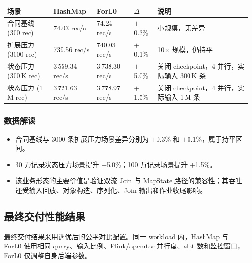 \documentclass[a4paper,11pt]{article}
\begin{document}
\begin{table}[H]
\centering
\small
\begin{tabularx}{\textwidth}{L{3.2cm} R{2.5cm} R{2.5cm} R{1.5cm} X}
\toprule
\textbf{场景} & \textbf{HashMap} & \textbf{ForL0} & $\Delta$ & \textbf{说明} \\
\midrule
合同基线 (300 rec) & 74.03 rec/s & 74.24 rec/s & $+$0.3\% & 小规模，无差异 \\
扩展压力 (3000 rec) & 739.56 rec/s & 740.03 rec/s & $+$0.1\% & 10$\times$ 规模，仍持平 \\
状态压力 (300\,K rec) & 3\,559.34 rec/s & 3\,738.30 rec/s & $+$5.0\% & 关闭 checkpoint，4 并行，实际输入 300\,K 条 \\
状态压力 (1\,M rec) & 3\,721.63 rec/s & 3\,778.97 rec/s & $+$1.5\% & 关闭 checkpoint，4 并行，实际输入 1\,M 条 \\
\bottomrule
\end{tabularx}
\end{table}

\subsubsection{数据解读}

\begin{itemize}
  \item 合同基线与 3000 条扩展压力场景差异分别为 $+$0.3\% 和 $+$0.1\%，属于持平区间。
  \item 30 万记录状态压力场景提升 $+$5.0\%；100 万记录场景提升 $+$1.5\%。
  \item 该业务形态的主要价值是验证双流 Join 与 MapState 路径的兼容性；其吞吐还受输入回放、对象构造、序列化、Join 输出和作业收尾影响。
\end{itemize}

\subsection{最终交付性能结果}

最终交付结果采用调优后的公平对比配置。同一 workload 内，HashMap 与 ForL0 使用相同 query、输入比例、Flink/operator 并行度、slot 数和监控窗口，ForL0 仅调整自身后端参数。
\end{document}
